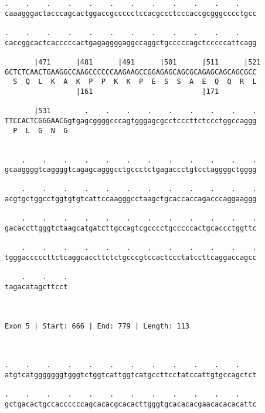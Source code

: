 \documentclass{article}
\begin{document}
\begin{Verbatim}
.    .    .    .    .    .    .    .    .    .    .    .    
caaagggactacccagcactggaccgccccctccacgccctcccaccgcgggcccctgcc
                                                            
.    .    .    .    .    .    .    .    .    .    .    .    
caccggcactcacccccactgagaggggaggccaggctgcccccagctcccccattcagg
                                                            
       |471      |481      |491      |501      |511      |521
GCTCTCAACTGAAGGCCAAGCCCCCCAAGAAGCCGGAGAGCAGCGCAGAGCAGCAGCGCC
  S  Q  L  K  A  K  P  P  K  K  P  E  S  S  A  E  Q  Q  R  L
                 |161                          |171         
  
       |531        .    .    .    .    .    .    .    .    .
TTCCACTCGGGAACGgtgagcggggcccagtgggagcgcctcccttctccctggccaggg
  P  L  G  N  G                                             
                                                            
  
    .    .    .    .    .    .    .    .    .    .    .    .
gcaaggggtcaggggtcagagcagggcctgccctctgagaccctgtcctaggggctgggg
                                                            
    .    .    .    .    .    .    .    .    .    .    .    .
acgtgctggcctggtgtgtcattccaagggcctaagctgcaccaccagacccaggaaggg
                                                            
    .    .    .    .    .    .    .    .    .    .    .    .
gacaccttgggtctaagcatgatcttgccagtcgcccctgcccccactgcaccctggttc
                                                            
    .    .    .    .    .    .    .    .    .    .    .    .
tgggacccccttctcaggcaccttctctgcccgtccactccctatccttcaggaccagcc
                                                            
    .    .    .
tagacatagcttcct
               
               
 
Exon 5 | Start: 666 | End: 779 | Length: 113



.    .    .    .    .    .    .    .    .    .    .    .    
atgtcatgggggggtgggtctggtcattggtcatgccttcctatccattgtgccagctct
                                                            
.    .    .    .    .    .    .    .    .    .    .    .    
gctgacactgccaccccccagcacacgcacacttgggtgcacacacgaacacacacattc
                                                            

\end{Verbatim}
\end{document}
